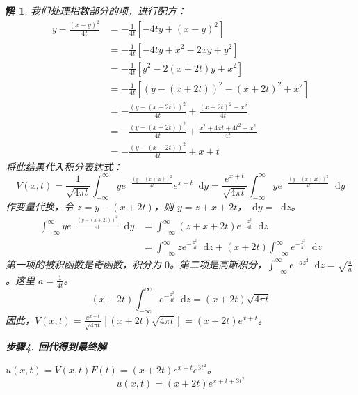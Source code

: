 \documentclass[12pt,a4paper]{article}
\newcommand{\diff}{\mathop{}\!\mathrm{d}}  %
\newtheorem*{solution}{解}
\begin{document}
\begin{solution}
	\noindent
	我们处理指数部分的项，进行配方：
	\begin{align*}
		y - \frac{(x-y)^2}{4t} &= -\frac{1}{4t} [-4ty + (x-y)^2] \\
		&= -\frac{1}{4t} [-4ty + x^2 - 2xy + y^2] \\
		&= -\frac{1}{4t} [y^2 - 2(x+2t)y + x^2] \\
		&= -\frac{1}{4t} \left[ (y - (x+2t))^2 - (x+2t)^2 + x^2 \right] \\
		&= -\frac{(y - (x+2t))^2}{4t} + \frac{(x+2t)^2 - x^2}{4t} \\
		&= -\frac{(y - (x+2t))^2}{4t} + \frac{x^2 + 4xt + 4t^2 - x^2}{4t} \\
		&= -\frac{(y - (x+2t))^2}{4t} + x + t
	\end{align*}
	将此结果代入积分表达式：
	\[
	V(x,t) = \frac{1}{\sqrt{4\pi t}} \int_{-\infty}^{\infty} y e^{-\frac{(y - (x+2t))^2}{4t}} e^{x+t} \diff y = \frac{e^{x+t}}{\sqrt{4\pi t}} \int_{-\infty}^{\infty} y e^{-\frac{(y - (x+2t))^2}{4t}} \diff y
	\]
	作变量代换，令 $z = y - (x+2t)$，则 $y = z + x + 2t$，$\diff y = \diff z$。
	\begin{align*}
		\int_{-\infty}^{\infty} y e^{-\frac{(y - (x+2t))^2}{4t}} \diff y &= \int_{-\infty}^{\infty} (z + x + 2t) e^{-\frac{z^2}{4t}} \diff z \\
		&= \int_{-\infty}^{\infty} z e^{-\frac{z^2}{4t}} \diff z + (x+2t) \int_{-\infty}^{\infty} e^{-\frac{z^2}{4t}} \diff z
	\end{align*}
	第一项的被积函数是奇函数，积分为 $0$。第二项是高斯积分，$\int_{-\infty}^{\infty} e^{-az^2}\diff z = \sqrt{\frac{\pi}{a}}$。这里 $a = \frac{1}{4t}$。
	\[
	(x+2t) \int_{-\infty}^{\infty} e^{-\frac{z^2}{4t}} \diff z = (x+2t)\sqrt{4\pi t}
	\]
	因此，$V(x,t) = \frac{e^{x+t}}{\sqrt{4\pi t}} \left[ (x+2t)\sqrt{4\pi t} \right] = (x+2t)e^{x+t}$。
	
	\hrulefill
	
	\textbf{步骤4. 回代得到最终解}
	
	\noindent
	$u(x,t) = V(x,t) F(t) = (x+2t)e^{x+t} e^{3t^2}$。
	\[
	u(x,t) = (x+2t)e^{x+t+3t^2}
	\]
\end{solution}
	
	\newpage
\end{document}
